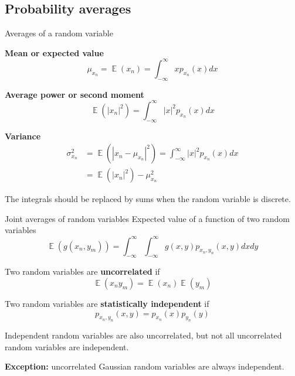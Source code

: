 \documentclass[10pt, handout]{beamer}
\DeclareMathOperator{\E}{\mathbb{E}} %
\begin{document}
\subsection{Probability averages}
\begin{frame}{Averages of a random variable}

\textbf{Mean or expected value}
\begin{equation*}
	\mu_{x_n} = \E(x_n) = \int_{-\infty}^{\infty}xp_{x_n}(x)dx
\end{equation*}

\pause
\textbf{Average power or second moment}
\begin{equation*} 
	\E(|x_n|^2) = \int_{-\infty}^{\infty}|x|^2p_{x_n}(x)dx
\end{equation*}

\pause
\textbf{Variance}
\begin{align*}
\sigma^2_{x_n} &= \E(|x_n-\mu_{x_n}|^2) = \int_{-\infty}^{\infty}|x|^2p_{x_n}(x)dx \\
&= \E(|x_n|^2) - \mu_{x_n}^2
\end{align*}

The integrals should be replaced by sums when the random variable is discrete.

\end{frame}

\begin{frame}{Joint averages of random variables}
Expected value of a function of two random variables
\begin{equation*}
\E(g(x_n,y_m)) = \int_{-\infty}^{\infty}\int_{-\infty}^{\infty}g(x, y)p_{x_n, y_n}(x, y)dxdy
\end{equation*}

\pause
Two random variables are \textbf{uncorrelated} if
\begin{equation*}
\E(x_ny_m) = \E(x_n)\E(y_m)
\end{equation*}

\pause
Two random variables are \textbf{statistically independent} if
\begin{equation*}
p_{x_n, y_n}(x,y) = p_{x_n}(x)p_{y_n}(y)
\end{equation*}

Independent random variables are also uncorrelated, but not all uncorrelated random variables are independent.

\textbf{Exception:} uncorrelated Gaussian random variables are always independent.
\end{frame}
\end{document}
